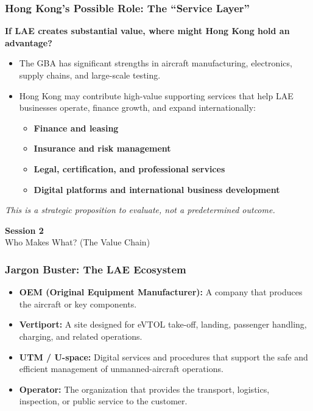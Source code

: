 \documentclass{beamer}
\begin{document}
\begin{frame}[t]
  \frametitle{Hong Kong's Possible Role: The ``Service Layer''}
  \textbf{If LAE creates substantial value, where might Hong Kong hold an advantage?}
  \begin{itemize}
    \item The GBA has significant strengths in aircraft manufacturing, electronics, supply chains, and large-scale testing.
    \item Hong Kong may contribute high-value supporting services that help LAE businesses operate, finance growth, and expand internationally:
    \begin{itemize}
      \item \textbf{Finance and leasing}
      \item \textbf{Insurance and risk management}
      \item \textbf{Legal, certification, and professional services}
      \item \textbf{Digital platforms and international business development}
    \end{itemize}
  \end{itemize}
  \textit{This is a strategic proposition to evaluate, not a predetermined outcome.}
\end{frame}

\begin{frame}[c]
  \begin{center}
    \huge\color{cuhkpurple}\textbf{Session 2}\\
    \vspace{0.5cm}
    \Large Who Makes What? (The Value Chain)
  \end{center}
\end{frame}

\begin{frame}[t]
  \frametitle{Jargon Buster: The LAE Ecosystem}
  \begin{itemize}
    \item \textbf{OEM (Original Equipment Manufacturer):} A company that produces the aircraft or key components.
    \item \textbf{Vertiport:} A site designed for eVTOL take-off, landing, passenger handling, charging, and related operations.
    \item \textbf{UTM / U-space:} Digital services and procedures that support the safe and efficient management of unmanned-aircraft operations.
    \item \textbf{Operator:} The organization that provides the transport, logistics, inspection, or public service to the customer.
  \end{itemize}
\end{frame}
\end{document}

